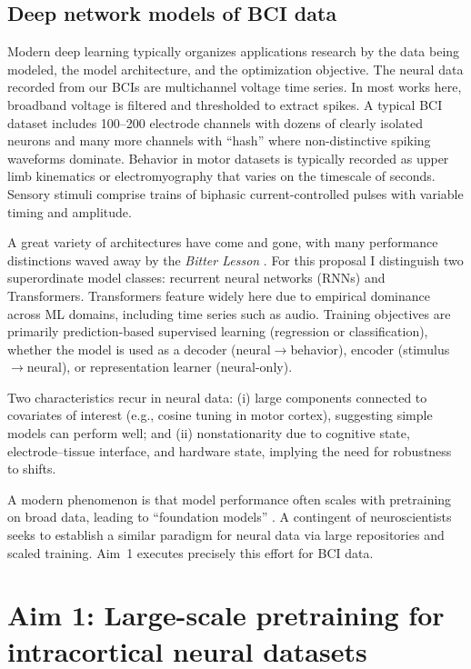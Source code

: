 \documentclass[12pt,oneside]{report}
\begin{document}
\section{Deep network models of BCI data}

Modern deep learning typically organizes applications research by the data being modeled, the model architecture, and the optimization objective. The neural data recorded from our BCIs are multichannel voltage time series. In most works here, broadband voltage is filtered and thresholded to extract spikes. A typical BCI dataset includes 100--200 electrode channels with dozens of clearly isolated neurons and many more channels with ``hash'' where non-distinctive spiking waveforms dominate. Behavior in motor datasets is typically recorded as upper limb kinematics or electromyography that varies on the timescale of seconds. Sensory stimuli comprise trains of biphasic current-controlled pulses with variable timing and amplitude.

A great variety of architectures have come and gone, with many performance distinctions waved away by the \emph{Bitter Lesson} \citep{sutton2019}. For this proposal I distinguish two superordinate model classes: recurrent neural networks (RNNs) and Transformers. Transformers feature widely here due to empirical dominance across ML domains, including time series such as audio. Training objectives are primarily prediction-based supervised learning (regression or classification), whether the model is used as a decoder (neural$\rightarrow$behavior), encoder (stimulus$\rightarrow$neural), or representation learner (neural-only).

Two characteristics recur in neural data: (i) large components connected to covariates of interest (e.g., cosine tuning in motor cortex), suggesting simple models can perform well; and (ii) nonstationarity due to cognitive state, electrode--tissue interface, and hardware state, implying the need for robustness to shifts.

A modern phenomenon is that model performance often scales with pretraining on broad data, leading to ``foundation models'' \citep{bommasani2021}. A contingent of neuroscientists seeks to establish a similar paradigm for neural data via large repositories and scaled training. Aim~1 executes precisely this effort for BCI data.

\chapter{Aim 1: Large-scale pretraining for intracortical neural datasets}
\end{document}
